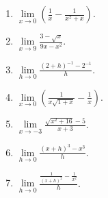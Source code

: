 \begin{multicols}{2}
\begin{enumerate}[ref={\fcProblemRef}]
\item $\displaystyle\lim\limits_{x\to 0}\left(\frac{1}x -\frac{1}{x^2+x}\right)$.

\item $\displaystyle\lim\limits_{x\to 9} \frac{3-\sqrt{x}}{9x-x^2}$.

\item $\displaystyle\lim\limits_{h \to 0}\frac{(2+h)^{-1}-2^{-1}}{h} $.

\item $\displaystyle\lim\limits_{x\to 0} \left(\frac{1}{x\sqrt{1+x}}-\frac{1}{x} \right)$.

\item $\displaystyle\lim\limits_{x\to -3} \frac{\sqrt{x^2+16}-5}{x+3}$.

\item $\displaystyle\lim\limits_{h\to 0}\frac{(x+h)^3-x^3}{h} $.

\item \label{problemlim_hto0_(1/(x+h)^2-1/x^2)/h} $\displaystyle\lim\limits_{h\to 0}\frac{\frac{1}{(x+h)^2}-\frac{1}{x^2}}{h} $.

\end{enumerate}
\end{multicols}
